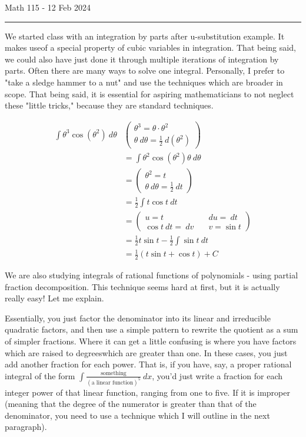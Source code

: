 \documentclass{article}
\begin{document}
Math 115 - 12 Feb 2024
\hrule

\vspace{10pt}

We started class with an integration by parts after u-substitution example. It makes useof a special property of cubic variables in integration. That being said, we could also have just done it through multiple iterations of integration by parts. Often there are many ways to solve one integral. Personally, I prefer to "take a sledge hammer to a nut" and use the techniques which are broader in scope. That being said, it is essential for aspiring mathematicians to not neglect these "little tricks," because they are standard techniques.

\begin{align*}
\int\theta^3\cos(\theta^2)\ d\theta&\left(\begin{aligned}\theta^3=\theta\cdot\theta^2\\\theta\ d\theta=\frac{1}{2}\ d(\theta^2)\end{aligned}\right)\\
&=\int\theta^2\cos(\theta^2)\theta\ d\theta\\
&=\left(\begin{aligned}\theta^2=t\\\theta\ d\theta=\frac{1}{2}\ dt\end{aligned}\right)\\
&=\frac{1}{2}\int t\cos t\ dt\\
&=\left(\begin{aligned}u=t&\quad du=\ dt\\\cos t\ dt=\ dv&\quad v=\sin t\end{aligned}\right)\\
&=\frac{1}{2}t\sin t-\frac{1}{2}\int\sin t\ dt\\
&=\frac{1}{2}(t\sin t+\cos t)+C
\end{align*}

\vspace{10pt}

We are also studying integrals of rational functions of polynomials - using partial fraction decomposition. This technique seems hard at first, but it is actually really easy! Let me explain.

\vspace{10pt}

Essentially, you just factor the denominator into its linear and irreducible quadratic factors, and then use a simple pattern to rewrite the quotient as a sum of simpler fractions. Where it can get a little confusing is where you have factors which are raised to degreeswhich are greater than one. In these cases, you just add another fraction for each power. That is, if you have, say, a proper rational integral of the form $\int\frac{\mbox{something}}{(\mbox{a linear function})^5}\ dx$, you'd just write a fraction for each integer power of that linear function, ranging from one to five. If it is improper (meaning that the degree of the numerator is greater than that of the denominator, you need to use a technique which I will outline in the next paragraph).
\end{document}
